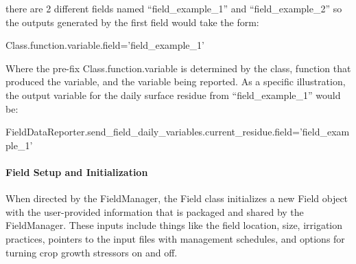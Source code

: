 there are 2 different fields named “field\_example\_1” and “field\_example\_2” so the outputs generated by the first field would take the form:

Class.function.variable.field=’field\_example\_1’

Where the pre-fix Class.function.variable is determined by the class, function that produced the variable, and the variable being reported. As a specific illustration, the output variable for the daily surface residue from “field\_example\_1” would be: 

FieldDataReporter.send\_field\_daily\_variables.current\_residue.field='field\_example\_1'

\paragraph{Field Setup and Initialization}
\vspace{-0.25cm}

When directed by the FieldManager, the Field class initializes a new Field object with the user-provided information that is packaged and shared by the FieldManager. These inputs include things like the field location, size, irrigation practices, pointers to the input files with management schedules, and options for turning crop growth stressors on and off. 



